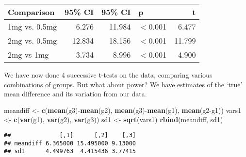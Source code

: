 \documentclass[]{article}
\newenvironment{Shaded}{\begin{snugshade}}{\end{snugshade}}
\newcommand{\KeywordTok}[1]{\textcolor[rgb]{0.13,0.29,0.53}{\textbf{{#1}}}}
\newcommand{\DataTypeTok}[1]{\textcolor[rgb]{0.13,0.29,0.53}{{#1}}}
\newcommand{\DecValTok}[1]{\textcolor[rgb]{0.00,0.00,0.81}{{#1}}}
\newcommand{\FloatTok}[1]{\textcolor[rgb]{0.00,0.00,0.81}{{#1}}}
\newcommand{\StringTok}[1]{\textcolor[rgb]{0.31,0.60,0.02}{{#1}}}
\newcommand{\NormalTok}[1]{{#1}}
\begin{document}
\begin{table}[ht]
\centering
\begin{tabular}{lrrlr}
  \hline
Comparison & 95\% CI & 95\% CI & p & t \\ 
  \hline
1mg vs. 0.5mg & 6.276 & 11.984 & $<$0.001 & 6.477 \\ 
  2mg vs. 0.5mg & 12.834 & 18.156 & $<$0.001 & 11.799 \\ 
  2mg vs 1mg & 3.734 & 8.996 & $<$0.001 & 4.900 \\ 
   \hline
\end{tabular}
\end{table}

We have now done 4 successive t-tests on the data, comparing various
combinations of groups. But what about power? We have estimates of the
`true' mean difference and its variation from our data.

\begin{Shaded}
\begin{Highlighting}[]
\NormalTok{meandiff <-}\StringTok{ }\KeywordTok{c}\NormalTok{(}\KeywordTok{mean}\NormalTok{(g3)-}\KeywordTok{mean}\NormalTok{(g2), }\KeywordTok{mean}\NormalTok{(g3)-}\KeywordTok{mean}\NormalTok{(g1), }\KeywordTok{mean}\NormalTok{(g2-g1))}
\NormalTok{vars1 <-}\StringTok{ }\KeywordTok{c}\NormalTok{(}\KeywordTok{var}\NormalTok{(g1), }\KeywordTok{var}\NormalTok{(g2), }\KeywordTok{var}\NormalTok{(g3))}
\NormalTok{sd1 <-}\StringTok{ }\KeywordTok{sqrt}\NormalTok{(vars1)}
\KeywordTok{rbind}\NormalTok{(meandiff, sd1)}
\end{Highlighting}
\end{Shaded}

\begin{verbatim}
##              [,1]      [,2]    [,3]
## meandiff 6.365000 15.495000 9.13000
## sd1      4.499763  4.415436 3.77415
\end{verbatim}

\begin{Shaded}
\end{Shaded}
\end{document}
